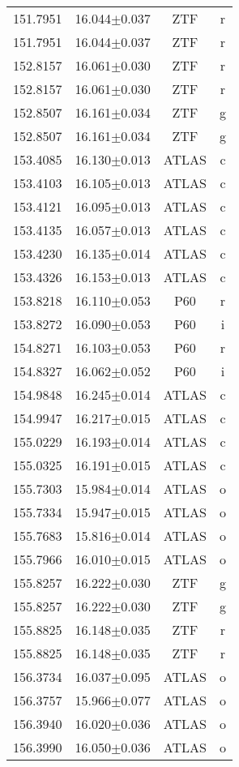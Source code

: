 \begin{table}
\begin{tabular}{cccc}
151.7951 & 16.044$\pm$0.037 & ZTF & r \\
151.7951 & 16.044$\pm$0.037 & ZTF & r \\
152.8157 & 16.061$\pm$0.030 & ZTF & r \\
152.8157 & 16.061$\pm$0.030 & ZTF & r \\
152.8507 & 16.161$\pm$0.034 & ZTF & g \\
152.8507 & 16.161$\pm$0.034 & ZTF & g \\
153.4085 & 16.130$\pm$0.013 & ATLAS & c \\
153.4103 & 16.105$\pm$0.013 & ATLAS & c \\
153.4121 & 16.095$\pm$0.013 & ATLAS & c \\
153.4135 & 16.057$\pm$0.013 & ATLAS & c \\
153.4230 & 16.135$\pm$0.014 & ATLAS & c \\
153.4326 & 16.153$\pm$0.013 & ATLAS & c \\
153.8218 & 16.110$\pm$0.053 & P60 & r \\
153.8272 & 16.090$\pm$0.053 & P60 & i \\
154.8271 & 16.103$\pm$0.053 & P60 & r \\
154.8327 & 16.062$\pm$0.052 & P60 & i \\
154.9848 & 16.245$\pm$0.014 & ATLAS & c \\
154.9947 & 16.217$\pm$0.015 & ATLAS & c \\
155.0229 & 16.193$\pm$0.014 & ATLAS & c \\
155.0325 & 16.191$\pm$0.015 & ATLAS & c \\
155.7303 & 15.984$\pm$0.014 & ATLAS & o \\
155.7334 & 15.947$\pm$0.015 & ATLAS & o \\
155.7683 & 15.816$\pm$0.014 & ATLAS & o \\
155.7966 & 16.010$\pm$0.015 & ATLAS & o \\
155.8257 & 16.222$\pm$0.030 & ZTF & g \\
155.8257 & 16.222$\pm$0.030 & ZTF & g \\
155.8825 & 16.148$\pm$0.035 & ZTF & r \\
155.8825 & 16.148$\pm$0.035 & ZTF & r \\
156.3734 & 16.037$\pm$0.095 & ATLAS & o \\
156.3757 & 15.966$\pm$0.077 & ATLAS & o \\
156.3940 & 16.020$\pm$0.036 & ATLAS & o \\
156.3990 & 16.050$\pm$0.036 & ATLAS & o \\

\end{tabular}
\end{table}
